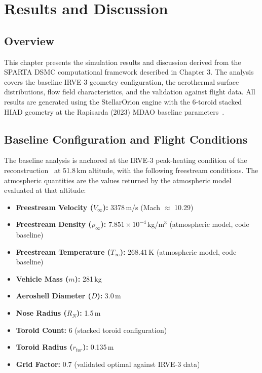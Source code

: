\chapter{Results and Discussion}
\label{ch:results}

\section{Overview}
This chapter presents the simulation results and discussion derived from the SPARTA DSMC computational framework described in Chapter 3. The analysis covers the baseline IRVE-3 geometry configuration, the aerothermal surface distributions, flow field characteristics, and the validation against flight data. All results are generated using the StellarOrion engine with the 6-toroid stacked HIAD geometry at the Rapisarda (2023) MDAO baseline parameters~\cite{rapisarda2023mdao}.

\section{Baseline Configuration and Flight Conditions}
The baseline analysis is anchored at the IRVE-3 peak-heating condition of the reconstruction~\cite{rapisarda2023mdao} at 51.8\,km altitude, with the following freestream conditions. The atmospheric quantities are the values returned by the atmospheric model evaluated at that altitude:
\begin{itemize}
    \item \textbf{Freestream Velocity ($V_{\infty}$):} 3378\,m/s (Mach $\approx$ 10.29)
    \item \textbf{Freestream Density ($\rho_{\infty}$):} $7.851 \times 10^{-4}$\,kg/m$^3$ (atmospheric model, code baseline)
    \item \textbf{Freestream Temperature ($T_{\infty}$):} 268.41\,K (atmospheric model, code baseline)
    \item \textbf{Vehicle Mass ($m$):} 281\,kg
    \item \textbf{Aeroshell Diameter ($D$):} 3.0\,m
    \item \textbf{Nose Radius ($R_N$):} 1.5\,m
    \item \textbf{Toroid Count:} 6 (stacked toroid configuration)
    \item \textbf{Toroid Radius ($r_{tor}$):} 0.135\,m
    \item \textbf{Grid Factor:} 0.7 (validated optimal against IRVE-3 data)
\end{itemize}

